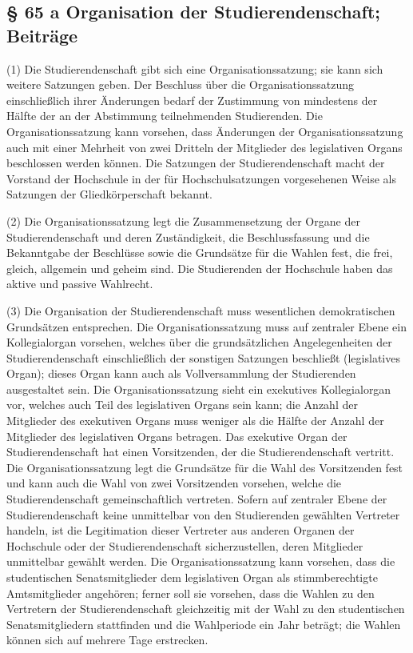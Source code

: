 \documentclass[
10pt,
a4paper,
twoside,								%
titlepage=false,							%
draft=false								%
]{scrartcl}
\begin{document}
\subsection{§ 65 a Organisation der Studierendenschaft; Beiträge}

(1) Die Studierendenschaft gibt sich eine Organisationssatzung; sie kann sich weitere Satzungen geben. Der Beschluss über die Organisationssatzung einschließlich ihrer Änderungen bedarf der Zustimmung von mindestens der Hälfte der an der Abstimmung teilnehmenden Studierenden. Die Organisationssatzung kann vorsehen, dass Änderungen der Organisationssatzung auch mit einer Mehrheit von zwei Dritteln der Mitglieder des legislativen Organs beschlossen werden können. Die Satzungen der Studierendenschaft macht der Vorstand der Hochschule in der für Hochschulsatzungen vorgesehenen Weise als Satzungen der Gliedkörperschaft bekannt.

(2) Die Organisationssatzung legt die Zusammensetzung der Organe der Studierendenschaft und deren Zuständigkeit, die Beschlussfassung und die Bekanntgabe der Beschlüsse sowie die Grundsätze für die Wahlen fest, die frei, gleich, allgemein und geheim sind. Die Studierenden der Hochschule haben das aktive und passive Wahlrecht.

(3) Die Organisation der Studierendenschaft muss wesentlichen demokratischen Grundsätzen entsprechen. Die Organisationssatzung muss auf zentraler Ebene ein Kollegialorgan vorsehen, welches über die grundsätzlichen Angelegenheiten der Studierendenschaft einschließlich der sonstigen Satzungen beschließt (legislatives Organ); dieses Organ kann auch als Vollversammlung der Studierenden ausgestaltet sein. Die Organisationssatzung sieht ein exekutives Kollegialorgan vor, welches auch Teil des legislativen Organs sein kann; die Anzahl der Mitglieder des exekutiven Organs muss weniger als die Hälfte der Anzahl der Mitglieder des legislativen Organs betragen. Das exekutive Organ der Studierendenschaft hat einen Vorsitzenden, der die Studierendenschaft vertritt. Die Organisationssatzung legt die Grundsätze für die Wahl des Vorsitzenden fest und kann auch die Wahl von zwei Vorsitzenden vorsehen, welche die Studierendenschaft gemeinschaftlich vertreten. Sofern auf zentraler Ebene der Studierendenschaft keine unmittelbar von den Studierenden gewählten Vertreter handeln, ist die Legitimation dieser Vertreter aus anderen Organen der Hochschule oder der Studierendenschaft sicherzustellen, deren Mitglieder unmittelbar gewählt werden. Die Organisationssatzung kann vorsehen, dass die studentischen Senatsmitglieder dem legislativen Organ als stimmberechtigte Amtsmitglieder angehören; ferner soll sie vorsehen, dass die Wahlen zu den Vertretern der Studierendenschaft gleichzeitig mit der Wahl zu den studentischen Senatsmitgliedern stattfinden und die Wahlperiode ein Jahr beträgt; die Wahlen können sich auf mehrere Tage erstrecken.
\end{document}
